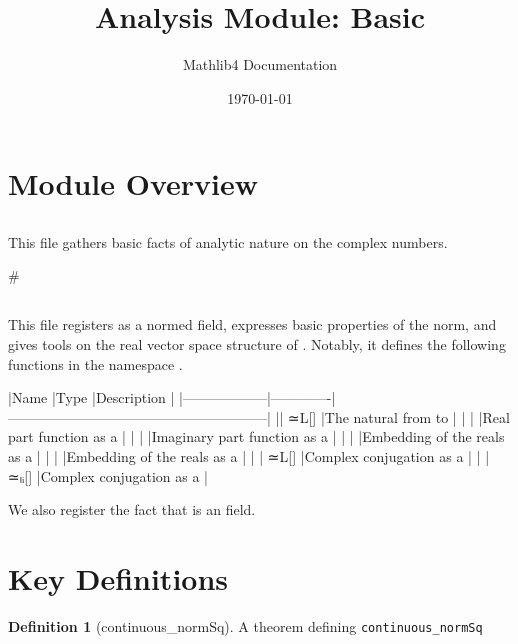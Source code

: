 \documentclass{article}
\title{Analysis Module: Basic}
\author{Mathlib4 Documentation}
\date{\today}
\theoremstyle{definition}
\newtheorem{definition}{Definition}
\begin{document}
\maketitle

\section{Module Overview}
\subsection{\1}

This file gathers basic facts of analytic nature on the complex numbers.

#\subsection{\1}

This file registers \texttt{\1} as a normed field, expresses basic properties of the norm, and gives tools
on the real vector space structure of \texttt{\1}. Notably, it defines the following functions in the
namespace \texttt{\1}.

|Name              |Type         |Description                                             |
|------------------|-------------|--------------------------------------------------------|
|\texttt{\1}| ≃L[]  \times {}|The natural \texttt{\1} from \texttt{\1} to \texttt{\1} |
|\texttt{\1}           | \toL[\mathbb{R}]     |Real part function as a \texttt{\1}           |
|\texttt{\1}           | \toL[\mathbb{R}]     |Imaginary part function as a \texttt{\1}      |
|\texttt{\1}       | \toL[\mathbb{R}]     |Embedding of the reals as a \texttt{\1}       |
|\texttt{\1}        |     |Embedding of the reals as a \texttt{\1}            |
|\texttt{\1}         | ≃L[]     |Complex conjugation as a \texttt{\1}        |
|\texttt{\1}         | ≃ₗᵢ[]    |Complex conjugation as a \texttt{\1}          |

We also register the fact that \texttt{\1} is an \texttt{\1} field.

\section{Key Definitions}
\begin{definition}[continuous_normSq]
A theorem defining \texttt{continuous_normSq}
\end{definition}
\end{document}
